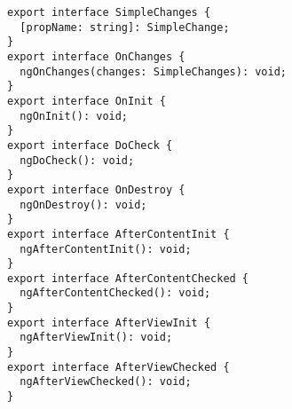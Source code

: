 \begin{verbatim}
export interface SimpleChanges {
  [propName: string]: SimpleChange;
}
export interface OnChanges {
  ngOnChanges(changes: SimpleChanges): void;
}
export interface OnInit {
  ngOnInit(): void;
}
export interface DoCheck {
  ngDoCheck(): void;
}
export interface OnDestroy {
  ngOnDestroy(): void;
}
export interface AfterContentInit {
  ngAfterContentInit(): void;
}
export interface AfterContentChecked {
  ngAfterContentChecked(): void;
}
export interface AfterViewInit {
  ngAfterViewInit(): void;
}
export interface AfterViewChecked {
  ngAfterViewChecked(): void;
}
\end{verbatim}
